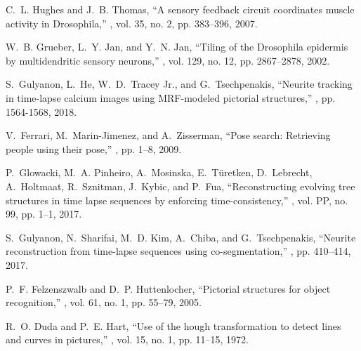 \documentclass{article}
\begin{document}



\small
\begin{thebibliography}{10}
\addtolength{\itemsep}{-1pt}

C.~L. Hughes and J.~B. Thomas,
\newblock ``A sensory feedback circuit coordinates muscle activity in
{Drosophila},''
, vol. 35, no. 2, pp. 383--396, 2007.

W.~B. Grueber, L.~Y. Jan, and Y.~N. Jan,
\newblock ``Tiling of the {Drosophila} epidermis by multidendritic sensory neurons,''
, vol. 129, no. 12, pp. 2867--2878, 2002.

S.~Gulyanon, L.~He, W.~D.~Tracey Jr., and G.~Tsechpenakis,
\newblock ``Neurite tracking in time-lapse calcium images using {MRF}-modeled pictorial structures,''
, pp. 1564-1568, 2018.

V.~Ferrari, M.~Marin-Jimenez, and A.~Zisserman,
\newblock ``Pose search: Retrieving people using their pose,''
, pp. 1--8, 2009.

P.~Glowacki, M.~A. Pinheiro, A.~Mosinska, E.~T{\"u}retken, D.~Lebrecht, A.~Holtmaat, R.~Sznitman, J.~Kybic, and P.~Fua,
\newblock ``Reconstructing evolving tree structures in time lapse sequences by enforcing time-consistency,''
, vol. PP, no. 99, pp. 1--1, 2017.

S.~Gulyanon, N.~Sharifai, M.~D. Kim, A.~Chiba, and G.~Tsechpenakis,
\newblock ``Neurite reconstruction from time-lapse sequences using co-segmentation,''
, pp. 410--414, 2017.

P.~F. Felzenszwalb and D.~P. Huttenlocher,
\newblock ``Pictorial structures for object recognition,''
, vol. 61, no. 1, pp. 55--79, 2005.

R.~O. Duda and P.~E. Hart,
\newblock ``Use of the hough transformation to detect lines and curves in pictures,''
, vol. 15, no. 1, pp. 11--15, 1972.


\end{thebibliography}
\end{document}
